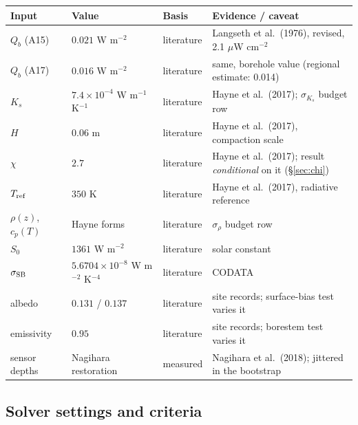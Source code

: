 \documentclass[11pt]{report}
\begin{document}
\begin{center}\footnotesize
\begin{tabular}{@{}llll@{}}
\toprule
Input & Value & Basis & Evidence / caveat \\
\midrule
$Q_b$ (A15) & $0.021$ W m$^{-2}$ & literature & Langseth et al.\ (1976), revised, 2.1 $\mu$W cm$^{-2}$ \\
$Q_b$ (A17) & $0.016$ W m$^{-2}$ & literature & same, borehole value (regional estimate: 0.014) \\
$K_s$ & $7.4\times10^{-4}$ W m$^{-1}$ K$^{-1}$ & literature & Hayne et al.\ (2017); $\sigma_{K_s}$ budget row \\
$H$ & $0.06$ m & literature & Hayne et al.\ (2017), compaction scale \\
$\chi$ & $2.7$ & literature & Hayne et al.\ (2017); result \emph{conditional} on it (\S\ref{sec:chi}) \\
$T_{\rm ref}$ & $350$ K & literature & Hayne et al.\ (2017), radiative reference \\
$\rho(z)$, $c_p(T)$ & Hayne forms & literature & $\sigma_\rho$ budget row \\
$S_0$ & $1361$ W m$^{-2}$ & literature & solar constant \\
$\sigma_{\rm SB}$ & $5.6704\times10^{-8}$ W m$^{-2}$ K$^{-4}$ & literature & CODATA \\
albedo & $0.131$ / $0.137$ & literature & site records; surface-bias test varies it \\
emissivity & $0.95$ & literature & site records; borestem test varies it \\
sensor depths & Nagihara restoration & measured & Nagihara et al.\ (2018); jittered in the bootstrap \\
\bottomrule
\end{tabular}
\end{center}

\subsection*{Solver settings and criteria}
\end{document}
